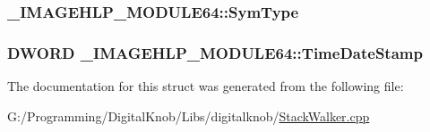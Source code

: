 \hypertarget{struct___i_m_a_g_e_h_l_p___m_o_d_u_l_e64_a18640a2da772eca54c9cce12fe881217}{
\subsubsection[{Sym\-Type}]{ \-\_\-\-I\-M\-A\-G\-E\-H\-L\-P\-\_\-\-M\-O\-D\-U\-L\-E64\-::\-Sym\-Type}}\label{struct___i_m_a_g_e_h_l_p___m_o_d_u_l_e64_a18640a2da772eca54c9cce12fe881217}
\hypertarget{struct___i_m_a_g_e_h_l_p___m_o_d_u_l_e64_a280ae94e389b6070e0e9a0b0d9b51012}{
\subsubsection[{Time\-Date\-Stamp}]{\setlength{\rightskip}{0pt plus 5cm}D\-W\-O\-R\-D \-\_\-\-I\-M\-A\-G\-E\-H\-L\-P\-\_\-\-M\-O\-D\-U\-L\-E64\-::\-Time\-Date\-Stamp}}\label{struct___i_m_a_g_e_h_l_p___m_o_d_u_l_e64_a280ae94e389b6070e0e9a0b0d9b51012}


The documentation for this struct was generated from the following file\-:\begin{DoxyCompactItemize}
\item 
G\-:/\-Programming/\-Digital\-Knob/\-Libs/digitalknob/\hyperlink{_stack_walker_8cpp}{Stack\-Walker.\-cpp}\end{DoxyCompactItemize}
